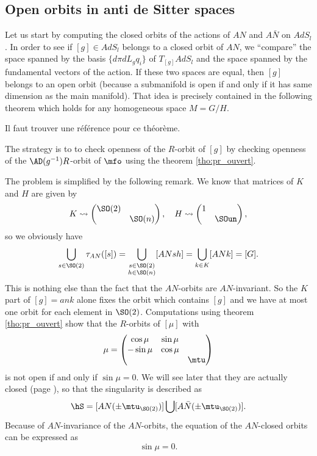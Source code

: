 \subsection{Open orbits in anti de Sitter spaces}

Let us start by computing the closed orbits of the actions of $AN$ and $A\bar{N}$ on $AdS_l$. In order to see if $[g]\in AdS_l$ belongs to a closed orbit of $AN$, we ``compare'' the space spanned by the basis $\{d\pi dL_g q_i\}$ of $T_{[g]}AdS_l$ and the space spanned by the fundamental vectors of the action. If these two spaces are equal, then $[g]$ belongs to an open orbit (because a submanifold is open if and only if it has same dimension as the main manifold). That idea is precisely contained in the following theorem which holds for any homogeneous space $M=G/H$.

\begin{probleme}
Il faut trouver une référence pour ce théorème.
\end{probleme}

The strategy is to to check openness of the $R$-orbit of $[g]$ by checking openness of the $\AD(g^{-1})R$-orbit of $\mfo$ using the theorem \ref{tho:pr_ouvert}.

The problem is simplified by the following remark.  We know that matrices of $K$ and $H$ are given by
\begin{equation}	\label{eq:K_H_SO}
  K\leadsto \begin{pmatrix}
                \SO(2)&   \\
		      & \SO(n)
            \end{pmatrix},\quad
  H\leadsto \begin{pmatrix}
                    1 & \\
		     & \SOun
            \end{pmatrix},
\end{equation}
so we obviously have
\[
\bigcup_{s\in \SO(2)} \tau_{AN}([s]) =\bigcup_{\substack { s\in \SO(2)\\ h\in \SO(n)}}[ANsh] =\bigcup_{k\in K} [ANk] =[G].
\]
This is nothing else than the fact that the $AN$-orbits are $AN$-invariant.
So the $K$ part of $[g]=ank$ alone fixes the orbit which contains $[g]$ and we have at most one orbit for each element in $\SO(2)$. Computations using theorem \ref{tho:pr_ouvert} show that the $R$-orbits of $[\mu]$ with
\[
\mu=
\begin{pmatrix}
\cos\mu &\sin\mu\\
-\sin\mu&\cos\mu\\
&&\mtu
\end{pmatrix}
\]
is not open if and only if $\sin \mu=0$. We will see later that they are actually closed (page \pageref{PgTopoOrb}), so that the singularity is described as
\begin{equation}\label{Sing2}
\hS=[AN(\pm\mtu_{\SO(2)})]\bigcup[A \bar{N}(\pm\mtu_{\SO(2)})].
\end{equation}
 Because of $AN$-invariance of the $AN$-orbits, the equation of the $AN$-closed orbits can be expressed as
\begin{equation}
\sin \mu=0.
\end{equation}

